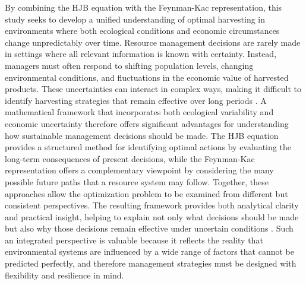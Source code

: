 \documentclass[11pt]{article}
\begin{document}
	By combining the HJB equation with the Feynman-Kac representation, this study seeks to develop a unified understanding of optimal harvesting in environments where both ecological conditions and economic circumstances change unpredictably over time. Resource management decisions are rarely made in settings where all relevant information is known with certainty. Instead, managers must often respond to shifting population levels, changing environmental conditions, and fluctuations in the economic value of harvested products. These uncertainties can interact in complex ways, making it difficult to identify harvesting strategies that remain effective over long periods \citep{vikramdeo2024abstract,vikramdeo2023profiling}. A mathematical framework that incorporates both ecological variability and economic uncertainty therefore offers significant advantages for understanding how sustainable management decisions should be made. The HJB equation provides a structured method for identifying optimal actions by evaluating the long-term consequences of present decisions, while the Feynman-Kac representation offers a complementary viewpoint by considering the many possible future paths that a resource system may follow. Together, these approaches allow the optimization problem to be examined from different but consistent perspectives. The resulting framework provides both analytical clarity and practical insight, helping to explain not only what decisions should be made but also why those decisions remain effective under uncertain conditions \citep{pramanik2024bayes}. Such an integrated perspective is valuable because it reflects the reality that environmental systems are influenced by a wide range of factors that cannot be predicted perfectly, and therefore management strategies must be designed with flexibility and resilience in mind.
	
\end{document}
